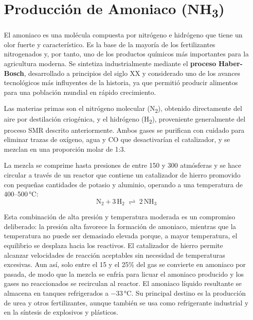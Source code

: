 \documentclass{article}
\begin{document}

    \section{Producción de Amoniaco (NH\textsubscript{3})}

    El amoniaco es una molécula compuesta por nitrógeno e hidrógeno que tiene un
    olor fuerte y característico. Es la base de la mayoría de los fertilizantes
    nitrogenados y, por tanto, uno de los productos químicos más importantes para
    la agricultura moderna. Se sintetiza industrialmente mediante el
    \textbf{proceso Haber-Bosch}, desarrollado a principios del siglo XX y
    considerado uno de los avances tecnológicos más influyentes de la historia, ya
    que permitió producir alimentos para una población mundial en rápido crecimiento.

    Las materias primas son el nitrógeno molecular (N\textsubscript{2}), obtenido
    directamente del aire por destilación criogénica, y el hidrógeno
    (H\textsubscript{2}), proveniente generalmente del proceso SMR descrito
    anteriormente. Ambos gases se purifican con cuidado para eliminar trazas de
    oxígeno, agua y CO que desactivarían el catalizador, y se mezclan en una
    proporción molar de 1:3.

    La mezcla se comprime hasta presiones de entre 150 y 300 atmósferas y se
    hace circular a través de un reactor que contiene un catalizador de hierro
    promovido con pequeñas cantidades de potasio y aluminio, operando a una
    temperatura de 400--500\,°C:
    \begin{equation}
        \text{N}_2 + 3\,\text{H}_2 \;\rightleftharpoons\; 2\,\text{NH}_3
    \end{equation}

    Esta combinación de alta presión y temperatura moderada es un compromiso
    deliberado: la presión alta favorece la formación de amoniaco, mientras que
    la temperatura no puede ser demasiado elevada porque, a mayor temperatura,
    el equilibrio se desplaza hacia los reactivos. El catalizador de hierro
    permite alcanzar velocidades de reacción aceptables sin necesidad de
    temperaturas excesivas. Aun así, solo entre el 15 y el 25\% del gas se
    convierte en amoniaco por pasada, de modo que la mezcla se enfría para
    licuar el amoniaco producido y los gases no reaccionados se recirculan al
    reactor. El amoniaco líquido resultante se almacena en tanques refrigerados
    a $-33$\,°C. Su principal destino es la producción de urea y otros
    fertilizantes, aunque también se usa como refrigerante industrial y en la
    síntesis de explosivos y plásticos.
\end{document}
